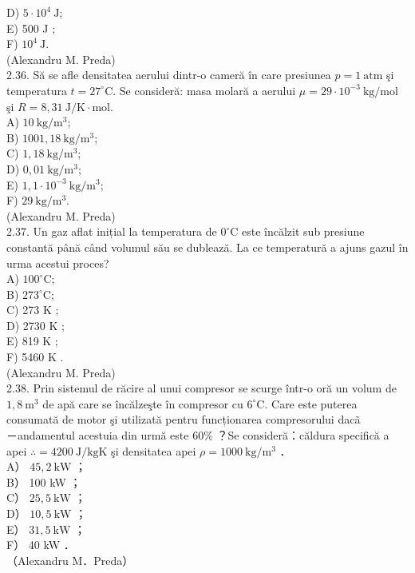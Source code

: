 D) $5 \cdot 10^{4} \mathrm{~J}$;\\
E) 500 J ;\\
F) $10^{4} \mathrm{~J}$.\\
(Alexandru M. Preda)\\
2.36. Să se afle densitatea aerului dintr-o cameră în care presiunea $p=1 \mathrm{~atm}$ şi temperatura $t=27^{\circ} \mathrm{C}$. Se consideră: masa molară a aerului $\mu=29 \cdot 10^{-3} \mathrm{~kg} / \mathrm{mol}$ şi $R=8,31 \mathrm{~J} / \mathrm{K} \cdot \mathrm{mol}$.\\
A) $10 \mathrm{~kg} / \mathrm{m}^{3}$;\\
B) $1001,18 \mathrm{~kg} / \mathrm{m}^{3}$;\\
C) $1,18 \mathrm{~kg} / \mathrm{m}^{3}$;\\
D) $0,01 \mathrm{~kg} / \mathrm{m}^{3}$;\\
E) $1,1 \cdot 10^{-3} \mathrm{~kg} / \mathrm{m}^{3}$;\\
F) $29 \mathrm{~kg} / \mathrm{m}^{3}$.\\
(Alexandru M. Preda)\\
2.37. Un gaz aflat inițial la temperatura de $0^{\circ} \mathrm{C}$ este încălzit sub presiune constantă până când volumul său se dublează. La ce temperatură a ajuns gazul în urma acestui proces?\\
A) $100^{\circ} \mathrm{C}$;\\
B) $273^{\circ} \mathrm{C}$;\\
C) 273 K ;\\
D) 2730 K ;\\
E) 819 K ;\\
F) 5460 K .\\
(Alexandru M. Preda)\\
2.38. Prin sistemul de răcire al unui compresor se scurge într-o oră un volum de $1,8 \mathrm{~m}^{3}$ de apă care se încălzeşte în compresor cu $6^{\circ} \mathrm{C}$. Care este puterea consumată de motor şi utilizată pentru funcționarea compresorului dacã\\
－andamentul acestuia din urmă este $60 \%$ ？Se consideră：căldura specifică a apei $\therefore=4200 \mathrm{~J} / \mathrm{kgK}$ şi densitatea apei $\rho=1000 \mathrm{~kg} / \mathrm{m}^{3}$ ．\\
A） $45,2 \mathrm{~kW}$ ；\\
B） 100 kW ；\\
C） $25,5 \mathrm{~kW}$ ；\\
D） $10,5 \mathrm{~kW}$ ；\\
E） $31,5 \mathrm{~kW}$ ；\\
F） 40 kW ．\\
（Alexandru M．Preda）

